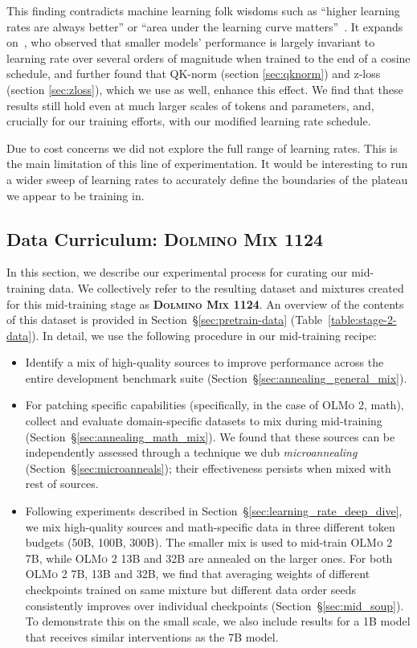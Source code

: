 \documentclass[table]{ai2style/ai2}
\newcommand{\olmotoo}{\textsc{OLMo 2}\xspace}
\newcommand{\dolminos}{\textsc{Dolmino Mix 1124}\xspace}
\begin{document}
This finding contradicts machine learning folk wisdoms such as ``higher learning rates are always better'' or ``area under the learning curve matters''~\citep{mccandlish2018empirical}.
It expands on~\citet{mitch}, who observed that smaller models' performance is largely invariant to learning rate over several orders of magnitude when trained to the end of a cosine schedule, and further found that QK-norm (section \ref{sec:qknorm}) and z-loss (section \ref{sec:zloss}), which we use as well, enhance this effect.
We find that these results still hold even at much larger scales of tokens and parameters, and, crucially for our training efforts, with our modified learning rate schedule.

Due to cost concerns we did not explore the full range of learning rates.
This is the main limitation of this line of experimentation.
It would be interesting to run a wider sweep of learning rates to accurately define the boundaries of the plateau we appear to be training in.

\subsection{Data Curriculum: \dolminos}
\label{sec:data-curriculum}

In this section, we describe our experimental process for curating our mid-training data.
We collectively refer to the resulting dataset and mixtures created for this mid-training stage as \textbf{\dolminos}. 
An overview of the contents of this dataset is provided in Section~\S\ref{sec:pretrain-data} (Table~\ref{table:stage-2-data}). 
In detail, we use the following procedure in our mid-training recipe:
\begin{itemize}
    \item Identify a mix of high-quality sources to improve performance across the entire development benchmark suite (Section~\S\ref{sec:annealing_general_mix}).
    \item For patching specific capabilities (specifically, in the case of \olmotoo, math), collect and evaluate domain-specific datasets to mix during mid-training (Section~\S\ref{sec:annealing_math_mix}). We found that these sources can be independently assessed through a technique we dub \textit{microannealing} (Section~\S\ref{sec:microanneals}); their effectiveness persists when mixed with rest of sources.  
    \item Following experiments described in Section~\S\ref{sec:learning_rate_deep_dive}, we mix high-quality sources and math-specific data in three different token budgets (50B, 100B, 300B). 
    The smaller mix is used to mid-train \olmotoo 7B, while \olmotoo 13B and 32B are annealed on the larger ones. 
    For both \olmotoo 7B, 13B and 32B, we find that averaging weights of different checkpoints trained on same mixture but different data order seeds consistently improves over individual checkpoints (Section~\S\ref{sec:mid_soup}). 
    To demonstrate this on the small scale, we also include results for a 1B model that receives similar interventions as the 7B model.
\end{itemize}
\end{document}
